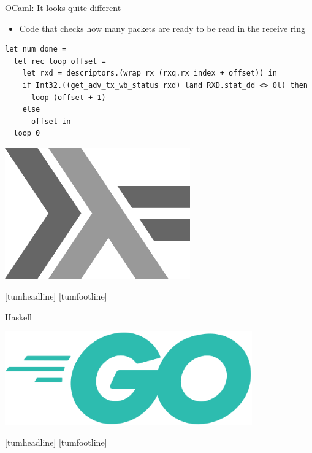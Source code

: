 \documentclass[NET,english,aspectratio=169,notitleframe]{tumbeamer}
\begin{document}
\begin{frame}[fragile]{OCaml: It looks quite different}
\begin{itemize}
\item Code that checks how many packets are ready to be read in the receive ring
\end{itemize}
\begin{verbatim}
let num_done =
  let rec loop offset =
    let rxd = descriptors.(wrap_rx (rxq.rx_index + offset)) in
    if Int32.((get_adv_tx_wb_status rxd) land RXD.stat_dd <> 0l) then
      loop (offset + 1)
    else
      offset in
  loop 0
\end{verbatim}
\end{frame}




\begin{frame}{}
\centering\includegraphics[width=0.6\textwidth]{pics/haskell}
\end{frame}
[tumheadline]
[tumfootline]

\begin{frame}{Haskell}
\end{frame}

\begin{frame}{}
\centering\includegraphics[width=0.8\textwidth]{pics/go}
\end{frame}
[tumheadline]
[tumfootline]
\end{document}
